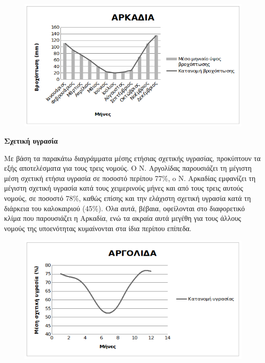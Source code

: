 \documentclass[12pt]{article}
\begin{document}
	\begin{figure} [H]
		\begin{center}
			\includegraphics [scale = 0.80] {rain3.png}
		\end{center}
	\end{figure}

	\textbf{Σχετική υγρασία}
	
	Με βάση τα παρακάτω διαγράμματα μέσης  ετήσιας σχετικής υγρασίας, προκύπτουν τα εξής αποτελέσματα για τους τρεις νομούς. Ο Ν. Αργολίδας παρουσιάζει τη μέγιστη μέση σχετική ετήσια υγρασία σε ποσοστό περίπου 77\%, o Ν. Αρκαδίας εμφανίζει τη μέγιστη σχετική υγρασία κατά τους χειμερινούς μήνες και από τους τρεις αυτούς νομούς, σε ποσοστό 78\%, καθώς επίσης και την ελάχιστη σχετική υγρασία κατά τη διάρκεια του καλοκαιριού (45\%). Όλα αυτά, βέβαια, οφείλονται στο διαφορετικό κλίμα που παρουσιάζει η Αρκαδία, ενώ τα ακραία αυτά μεγέθη για τους άλλους νομούς της υποενότητας κυμαίνονται στα ίδια περίπου επίπεδα.
	
	\begin{figure} [H]
		\begin{center}
			\includegraphics [scale = 0.80] {ygrasia1.png}
		\end{center}
	\end{figure}
\end{document}
